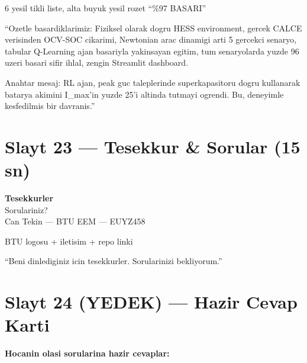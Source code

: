 \documentclass[11pt,a4paper]{article}
\begin{document}
\begin{gorselboks}
6 yesil tikli liste, alta buyuk yesil rozet ``\%97 BASARI''
\end{gorselboks}

\begin{sayboks}
``Ozetle basardiklarimiz: Fiziksel olarak dogru HESS environment, gercek CALCE verisinden OCV-SOC cikarimi, Newtonian arac dinamigi arti 5 gercekci senaryo, tabular Q-Learning ajan basariyla yakinsayan egitim, tum senaryolarda yuzde 96 uzeri basari sifir ihlal, zengin Streamlit dashboard.

Anahtar mesaj: RL ajan, peak guc taleplerinde superkapasitoru dogru kullanarak batarya akimini I\_max'in yuzde 25'i altinda tutmayi ogrendi. Bu, deneyimle kesfedilmis bir davranis.''
\end{sayboks}

\section{Slayt 23 --- Tesekkur \& Sorular (15 sn)}

\begin{slytboks}
\centering
{\Huge \textbf{Tesekkurler}}\\[1.5em]
{\Large Sorulariniz?}\\[1.5em]
\normalsize Can Tekin --- BTU EEM --- EUYZ458
\end{slytboks}

\begin{gorselboks}
BTU logosu + iletisim + repo linki
\end{gorselboks}

\begin{sayboks}
``Beni dinlediginiz icin tesekkurler. Sorularinizi bekliyorum.''
\end{sayboks}

\section*{Slayt 24 (YEDEK) --- Hazir Cevap Karti}

\begin{tcolorbox}[colback=red!5,colframe=red!50!black,boxrule=0.4pt,
                  title={\color{white}\bfseries Bu slaytı GOSTERME --- sadece sen bakacaksin}]
\textbf{Hocanin olasi sorularina hazir cevaplar:}
\end{tcolorbox}
\end{document}
